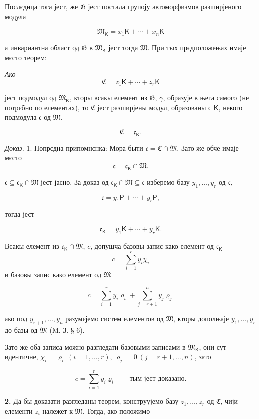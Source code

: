 \documentclass[11pt]{article}
\begin{document}
Послєдица тога јест, же \(\mathfrak G\) јест постала групоју автоморфизмов разширјеного модула

\[
\mathfrak M_{\mathsf K}=x_1\mathsf K+\cdots+x_n\mathsf K
\]

а инвариантна област од \(\mathfrak G\) в \(\mathfrak M_{\mathsf K}\) јест тогда \(\mathfrak M\). При тых прєдположењах имаје мєсто теорем:

\begingroup\itshape
Ако
\[
\mathfrak C=z_1\mathsf K+\cdots+z_r\mathsf K
\]

јест подмодул од \(\mathfrak M_{\mathsf K}\), кторы всакы елемент из \(\mathfrak G\), \(\gamma\), образује в њега самого (не потрєбно по елементах), то \(\mathfrak C\) јест разширјены модул, образованы с \(\mathsf K\), некого подмодула \(\mathfrak c\) од \(\mathfrak M\).

\[
\mathfrak C=\mathfrak c_{\mathsf K}.
\]
\endgroup

\emph{Доказ.} 1. Попрєдна припомнєнка: Мора быти \(\mathfrak c=\mathfrak C\cap\mathfrak M\). Зато же обче имаје мєсто
\[
\mathfrak c=\mathfrak c_{\mathsf K}\cap\mathfrak M.
\]

\(\mathfrak c\subseteq\mathfrak c_{\mathsf K}\cap\mathfrak M\) јест јасно. За доказ од \(\mathfrak c_{\mathsf K}\cap\mathfrak M\subseteq\mathfrak c\) изберемо базу \(y_1,\ldots,y_r\) од \(\mathfrak c\),

\[
\mathfrak c=y_1\mathsf P+\cdots+y_r\mathsf P,
\]

тогда јест

\[
\mathfrak c_{\mathsf K}=y_1\mathsf K+\cdots+y_r\mathsf K.
\]

Всакы елемент из \(\mathfrak c_{\mathsf K}\cap\mathfrak M\), \(c\), допушча базовы запис како елемент од \(\mathfrak c_{\mathsf K}\)
\[
c=\sum_{i=1}^{r}y_i\chi_i
\]
и базовы запис како елемент од \(\mathfrak M\)

\[
c=\sum_{i=1}^{r}y_i\varrho_i+\sum_{j=r+1}^{n}y_j\varrho_j
\]

ако под \(y_{r+1},\ldots,y_n\) разумєјемо систем елементов од \(\mathfrak M\), кторы дополњаје \(y_1,\ldots,y_r\) до базы од \(\mathfrak M\) (M. З. § 6).

Зато же оба записа можно разгледати базовыми записами в \(\mathfrak M_{\mathsf K}\), они сут идентичне, \(\chi_i=\varrho_i\ (i=1,\ldots,r)\), \(\varrho_j=0\ (j=r+1,\ldots,n)\), зато

\[
c=\sum_{i=1}^{r}y_i\varrho_i
\qquad\text{тым јест доказано.}
\]

\textbf{2.} Да бы доказати разгледаны теорем, конструујемо базу \(z_1,\ldots,z_r\) од \(\mathfrak C\), чији елементи \(z_i\) належет к \(\mathfrak M\). Тогда, ако положимо
\end{document}
